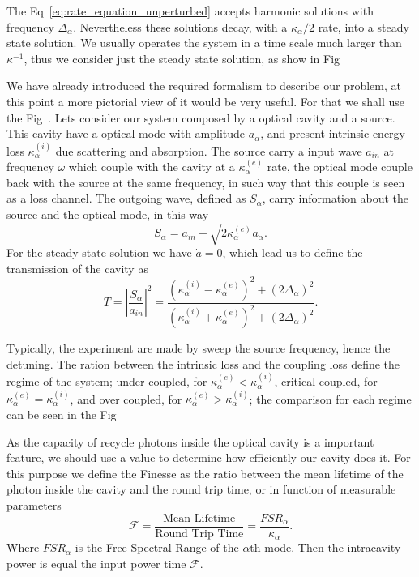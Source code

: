 The Eq~\ref{eq:rate_equation_unperturbed} accepts harmonic solutions with frequency $\Delta_\alpha$. Nevertheless these solutions decay, with a  $\kappa_\alpha/2$ rate, into a steady state solution. We usually operates the system in a time scale much larger than $\kappa^{-1}$, thus we consider just the steady state solution, as show in Fig~

We have already introduced the required formalism to describe our problem, at this point a more pictorial view of it would be very useful. For that we shall use the Fig~. Lets consider our system composed by a optical cavity and a source. This cavity have a optical mode with amplitude $a_\alpha$, and present intrinsic energy loss $\kappa_\alpha^{(i)}$ due scattering and absorption. The source carry a input wave $a_{in}$ at frequency $\omega$ which couple with the cavity at a $\kappa_\alpha^{(e)}$ rate, the optical mode couple back with the source at the same frequency, in such way that this couple is seen as a loss channel. The outgoing wave, defined as $S_\alpha$, carry information about the source and the optical mode, in this way
\begin{equation}
    S_\alpha = a_{in} - \sqrt{2 \kappa_\alpha^{(e)}}a_\alpha.
\end{equation}
For the steady state solution we have $\dot{a} = 0$, which lead us to define the transmission of the cavity as
\begin{equation}
    T = \left|\frac{S_\alpha}{a_{in}}\right|^2 = \frac{\left(\kappa_\alpha^{(i)} -\kappa_\alpha^{(e)}\right)^2 + (2\Delta_\alpha)^2}{\left(\kappa_\alpha^{(i)} +\kappa_\alpha^{(e)}\right)^2 + (2\Delta_\alpha)^2}.
    \label{eq:single_mode_transmission}
\end{equation}

Typically, the experiment are made by sweep the source frequency, hence the detuning. The ration between the intrinsic loss and the coupling loss define the regime of the system; under coupled, for $\kappa_\alpha^{(e)} < \kappa_\alpha^{(i)}$, critical coupled, for $\kappa_\alpha^{(e)} = \kappa_\alpha^{(i)}$, and over coupled, for $\kappa_\alpha^{(e)} > \kappa_\alpha^{(i)}$; the comparison for each regime can be seen in the Fig~ 

As the capacity of recycle photons inside the optical cavity is a important feature, we should use a value to determine how efficiently our cavity does it. For this purpose we define the Finesse as the ratio between the mean lifetime of the photon inside the cavity and the round trip time, or in function of measurable parameters 
\begin{equation}
    \mathcal{F} = \frac{\text{Mean Lifetime}}{\text{Round Trip Time}} = \frac{FSR_\alpha}{\kappa_\alpha}.
    \label{eq:finesse}
\end{equation}
Where $FSR_\alpha$ is the Free Spectral Range of the $\alpha$th mode. Then the intracavity power is equal the input power time $\mathcal{F}$.

